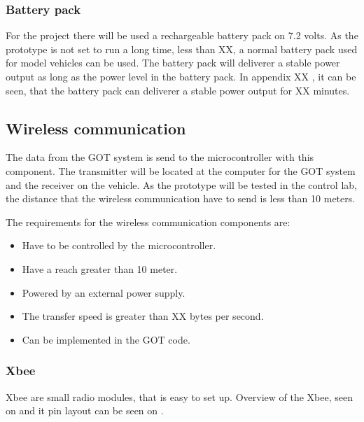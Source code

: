 \subsubsection{Battery pack}
For the project there will be used a rechargeable battery pack on 7.2 volts. As the prototype is not set to run a long time, less than XX, a normal battery pack used for model vehicles can be used. The battery pack will deliverer a stable power output as long as the power level in the battery pack. In appendix XX , it can be seen, that the battery pack can deliverer a stable power output for XX minutes.


\subsection{Wireless communication}
The data from the GOT system is send to the microcontroller with this component. The transmitter will be located at the computer for the GOT system and the receiver on the vehicle. As the prototype will be tested in the control lab, the distance that the wireless communication have to send is less than 10 meters.

The requirements for the wireless communication components are:
\begin{itemize}
\item Have to be controlled by the microcontroller.
\item Have a reach greater than 10 meter. 
\item Powered by an external power supply.
\item The transfer speed is greater than XX bytes per second. 
\item Can be implemented in the GOT code.
\end{itemize}

\subsubsection{Xbee}
Xbee are small radio modules, that is easy to set up. Overview of the Xbee, seen on  and it pin layout can be seen on .


